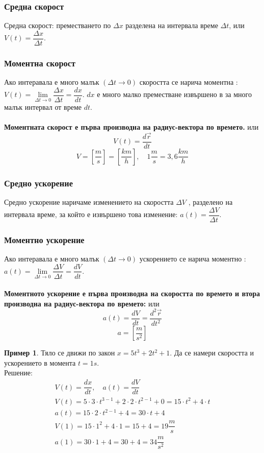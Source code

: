 \documentclass[fleqn, 12pt]{article}
\theoremstyle{definition}
\newtheorem{example}{Пример}[subsection]
\begin{document}
\subsubsection{Средна скорост}
Средна скорост: преместването по $\Delta x$ разделена на интервала време $\Delta t$, или $V(t) = \dfrac{\Delta x}{\Delta t}$.

\subsubsection{Моментна скорост}
Ако интеравала е много малък $(\Delta t \rightarrow 0)$ скоростта се нарича моментна : $V(t) = \lim\limits_{\Delta t \rightarrow 0}\dfrac{\Delta x}{\Delta t} = \dfrac{dx}{dt}$. $dx$ е много малко преместване извършено в за много малък интервал от време $dt$.\\
\\
\textbf{Моментната скорост е първа производна на радиус-вектора по времето.} или 
$$V(t) = \dfrac{d \vec{r}}{dt}$$
$$V = \left[ \dfrac{m}{s}\right] = \left[ \dfrac{km}{h}\right], \quad 1\dfrac{m}{s} = 3,6 \dfrac{km}{h} $$

\subsubsection{Средно ускорение}
Средно ускорение наричаме изменението на скоростта $\Delta V$ , разделено на интервала време, за който е извършено това изменение: $a(t) =\dfrac{\Delta V}{\Delta t}$.

\subsubsection{Моментно ускорение}
Ако интеравала е много малък $(\Delta t \rightarrow 0)$ ускорението се нарича моментно : $a(t) = \lim\limits_{\Delta t \rightarrow 0}\dfrac{\Delta V}{\Delta t} = \dfrac{dV}{dt}$.\\
\\
\textbf{Моментното ускорение е първа производна на скоростта по времето и втора производна на радиус-вектора по времето: } или 
$$a(t) =  \dfrac{dV}{dt} = \dfrac{d^2 \vec{r}}{dt^2}$$
$$a = \left[ \dfrac{m}{s^2} \right]$$

\begin{example}
Тяло се движи по закон $x = 5t^3 + 2t^2 + 1$. Да се намери скоростта и ускорението в момента $t = 1s$. \\
Решение: \\
\begin{gather*}
V(t) = \dfrac{dx}{dt}, \quad a(t) = \dfrac{dV}{dt} \\
V(t) = 5 \cdot 3 \cdot t^{3-1} + 2 \cdot 2 \cdot t^{2-1} + 0 = 15 \cdot t^2 + 4\cdot t \\
a(t) = 15\cdot 2 \cdot t^{2-1} + 4 = 30 \cdot t + 4 \\
V(1) = 15 \cdot 1^2 + 4 \cdot 1 = 15 + 4 = 19 \dfrac{m}{s} \\
a(1) = 30 \cdot 1 + 4 = 30 + 4 = 34 \dfrac{m}{s^2}
\end{gather*}
\end{example}
\end{document}
